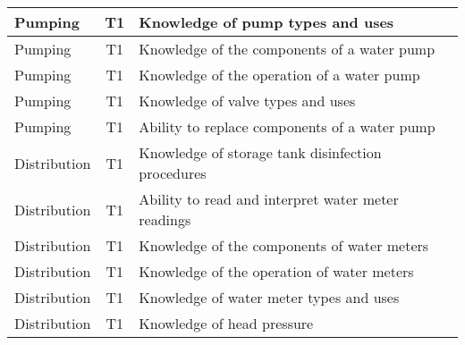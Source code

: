 \documentclass{article}
\begin{document}
\begin{table}[]
\begin{tabular}{|l|c|l|}
Pumping                                & T1             & Knowledge of pump   types and uses                                                                                                \\ \hline
Pumping                                & T1             & Knowledge of the   components of a water pump                                                                                     \\ \hline
Pumping                                & T1             & Knowledge of the   operation of a water pump                                                                                      \\ \hline
Pumping                                & T1             & Knowledge of valve   types and uses                                                                                               \\ \hline
Pumping                                & T1             & Ability to replace   components of a water pump                                                                                   \\ \hline
Distribution                           & T1             & Knowledge of storage   tank disinfection procedures                                                                               \\ \hline
Distribution                           & T1             & Ability to read and   interpret water meter readings                                                                              \\ \hline
Distribution                           & T1             & Knowledge of the   components of water meters                                                                                     \\ \hline
Distribution                           & T1             & Knowledge of the   operation of water meters                                                                                      \\ \hline
Distribution                           & T1             & Knowledge of water   meter types and uses                                                                                         \\ \hline
Distribution                           & T1             & Knowledge of head   pressure                                                                                                      \\ \hline

\end{tabular}
\end{table}
\end{document}
